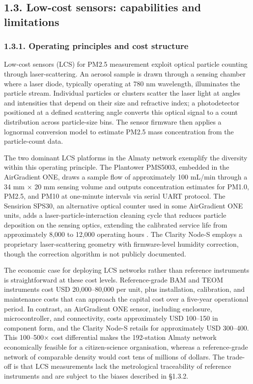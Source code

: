 \subsection{1.3. Low-cost sensors: capabilities and limitations}\label{low-cost-sensors-capabilities-and-limitations}

\subsubsection{1.3.1. Operating principles and cost structure}\label{operating-principles-and-cost-structure}

Low-cost sensors (LCS) for PM2.5 measurement exploit optical particle counting through laser-scattering. An aerosol sample is drawn through a sensing chamber where a laser diode, typically operating at 780 nm wavelength, illuminates the particle stream. Individual particles or clusters scatter the laser light at angles and intensities that depend on their size and refractive index; a photodetector positioned at a defined scattering angle converts this optical signal to a count distribution across particle-size bins. The sensor firmware then applies a lognormal conversion model to estimate PM2.5 mass concentration from the particle-count data.

The two dominant LCS platforms in the Almaty network exemplify the diversity within this operating principle. The Plantower PMS5003, embedded in the AirGradient ONE, draws a sample flow of approximately 100 mL/min through a 34 mm × 20 mm sensing volume and outputs concentration estimates for PM1.0, PM2.5, and PM10 at one-minute intervals via serial UART protocol. The Sensirion SPS30, an alternative optical counter used in some AirGradient ONE units, adds a laser-particle-interaction cleaning cycle that reduces particle deposition on the sensing optics, extending the calibrated service life from approximately 8,000 to 12,000 operating hours \cite{sensirion2023sps30}. The Clarity Node-S employs a proprietary laser-scattering geometry with firmware-level humidity correction, though the correction algorithm is not publicly documented.

The economic case for deploying LCS networks rather than reference instruments is straightforward at these cost levels. Reference-grade BAM and TEOM instruments cost USD 20,000--80,000 per unit, plus installation, calibration, and maintenance costs that can approach the capital cost over a five-year operational period. In contrast, an AirGradient ONE sensor, including enclosure, microcontroller, and connectivity, costs approximately USD 100--150 in component form, and the Clarity Node-S retails for approximately USD 300--400. This 100--500× cost differential makes the 192-station Almaty network economically feasible for a citizen-science organisation, whereas a reference-grade network of comparable density would cost tens of millions of dollars. The trade-off is that LCS measurements lack the metrological traceability of reference instruments and are subject to the biases described in §1.3.2.

